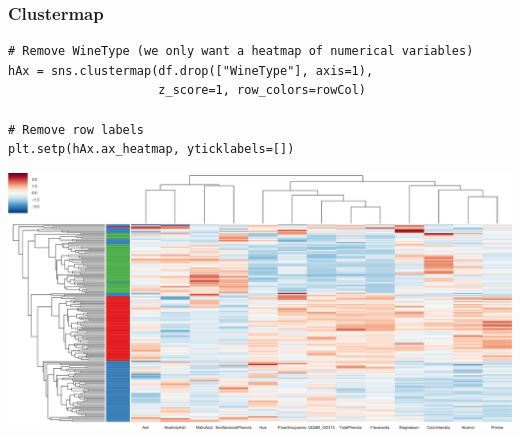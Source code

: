 \documentclass[pdf]{beamer}
\begin{document}
\begin{frame}[fragile]
\frametitle{Clustermap}


\begin{lstlisting}[style=python]
# Remove WineType (we only want a heatmap of numerical variables)
hAx = sns.clustermap(df.drop(["WineType"], axis=1), 
                     z_score=1, row_colors=rowCol)

# Remove row labels
plt.setp(hAx.ax_heatmap, yticklabels=[])
\end{lstlisting}

\vspace{-0.7cm}
\begin{center}
	\includegraphics[width=.8\textwidth]{clustermap.pdf}
\end{center}

\end{frame}


\end{document}
